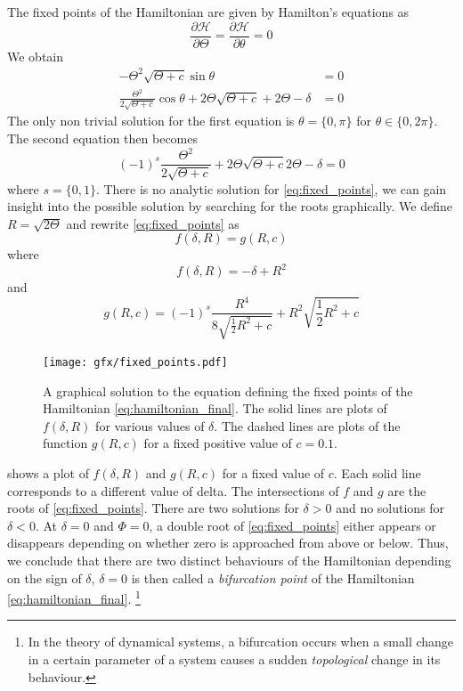 \documentclass[twoside,openright,titlepage,numbers=noenddot,headinclude,%
                footinclude=true,cleardoublepage=empty,abstractoff, 
                BCOR=5mm,paper=a4,fontsize=11pt,%
                american,%
                ]{scrreprt}%
\begin{document}
The fixed points of the Hamiltonian are given by Hamilton's equations
as
\begin{equation}
    \frac{\partial \mathcal{H}}{\partial\Theta} = 
    \frac{\partial\mathcal{H}}{\partial\theta}=0
\end{equation}
We obtain 
\begin{align}
    -\Theta^2\sqrt{\Theta +c}\sin\theta&=0\\
     \frac{\Theta^2}{2\sqrt{\Theta + c}}\cos\theta +2\Theta\sqrt{\Theta+c}
    +2\Theta-\delta&=0
    \label{eq:saddle_point}
\end{align}
The only non trivial solution for the first equation is $\theta=\{0,\pi\}$
for $\theta\in\{0,2\pi\}$. The second equation then becomes
\begin{equation}
    (-1)^s\frac{\Theta^2}{2\sqrt{\Theta + c}} +2\Theta\sqrt{\Theta+c}
    2\Theta-\delta=0
    \label{eq:fixed_points}
\end{equation}
where $s=\{0,1\}$. There is no analytic solution for \cref{eq:fixed_points}, 
we can gain insight into the possible solution by searching for the roots
graphically. We define $R=\sqrt{2\Theta}$ and rewrite \cref{eq:fixed_points}
as
\begin{equation}
    f(\delta, R)=g(R,c)
\end{equation}
where
\begin{equation}
    f(\delta,R) = -\delta+R^2
\end{equation}
and
\begin{equation}
    g(R,c)=(-1)^s \frac{  R^4}{8\sqrt{ \frac{1}{2} R^2+c}} 
    +R^2\sqrt{ \frac{1}{2}R^2+c} 
\end{equation}
\begin{figure}[htb]
\centering
\texttt{[image: gfx/fixed\_points.pdf]}
    \caption[Graphical solution for the fixed points.]{A 
    graphical solution to the equation defining the fixed points of
    the Hamiltonian \ref{eq:hamiltonian_final}. The solid lines are 
    plots of $f(\delta,R)$ for various values of $\delta$. The dashed
    lines are plots of the function $g(R, c)$  for a fixed positive value
    of $c=0.1$.}
\label{fig:fixed_points}
\end{figure}
 shows a plot of $f(\delta,R)$ and $g(R,c)$
for a fixed value of $c$. Each solid line corresponds to a different
value of delta. The intersections of $f$ and $g$ are the roots of 
\cref{eq:fixed_points}. There are two solutions for $\delta>0$
and no solutions for $\delta<0$. At $\delta=0$ and $\Phi=0$, a double root
of \cref{eq:fixed_points} either appears or disappears depending on whether
zero is approached from above or below. Thus, we conclude that there are two 
distinct behaviours of the Hamiltonian depending on the sign of $\delta$,
$\delta=0$ is then called a \emph{bifurcation point} of the
Hamiltonian \ref{eq:hamiltonian_final}.
\footnote{In the theory of dynamical systems, a bifurcation occurs when a small 
change in a certain parameter of a system causes a sudden \emph{topological} 
change in its behaviour.}
\end{document}

